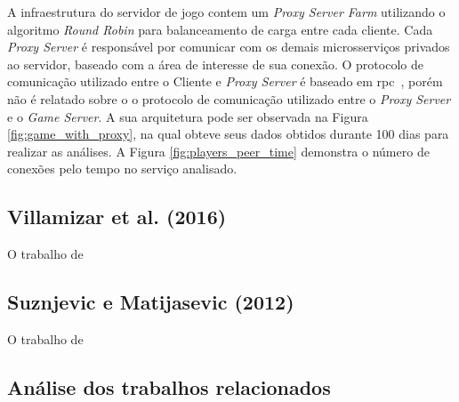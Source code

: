 A infraestrutura do servidor de jogo contem um \textit{Proxy Server Farm} utilizando o algoritmo \textit{Round Robin} para balanceamento de carga entre cada cliente.
%
Cada \textit{Proxy Server} é responsável por comunicar com os demais microsserviços privados ao servidor, baseado com a área de interesse de sua conexão.
%
O protocolo de comunicação utilizado entre o Cliente e \textit{Proxy Server} é baseado em \ac{rpc}~\cite{faber, borella}, porém não é relatado sobre o o protocolo de comunicação utilizado entre o \textit{Proxy Server} e o \textit{Game Server}.
%
A sua arquitetura pode ser observada na Figura \ref{fig:game_with_proxy}, na qual obteve seus dados obtidos durante 100 dias para realizar as análises.
%
A Figura \ref{fig:players_peer_time} demonstra o número de conexões pelo tempo no serviço analisado.



\subsection{Villamizar et al. (2016)}
O trabalho de ~\cite{7515686}

\subsection{Suznjevic e Matijasevic (2012)}
O trabalho de ~\cite{6374456}

\subsection{Análise dos trabalhos relacionados}
\label{sec:similares_analise}
